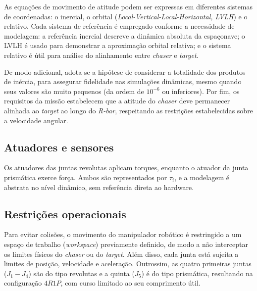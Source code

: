 As equações de movimento de atitude podem ser expressas em diferentes sistemas de coordenadas: o inercial, o orbital (\emph{Local-Vertical-Local-Horizontal, LVLH}) e o relativo.
Cada sistema de referência é empregado conforme a necessidade de modelagem:
a referência inercial descreve a dinâmica absoluta da espaçonave;
o LVLH é usado para demonstrar a aproximação orbital relativa;
e o sistema relativo é útil para análise do alinhamento entre \emph{chaser} e \emph{target}.

De modo adicional, adota-se a hipótese de considerar a totalidade dos produtos de inércia, para assegurar fidelidade nas simulações dinâmicas, mesmo quando seus valores são muito pequenos (da ordem de $10^{-6}$ ou inferiores).
Por fim, os requisitos da missão estabelecem que a atitude do \emph{chaser} deve permanecer alinhada ao \emph{target} ao longo do \emph{R-bar}, respeitando as restrições estabelecidas sobre a velocidade angular.

\subsection{Atuadores e sensores}
Os atuadores das juntas revolutas aplicam torques, enquanto o atuador da junta prismática exerce força.
Ambos são representados por $\tau_i$, e a modelagem é abstrata no nível dinâmico, sem referência direta ao hardware.

\subsection{Restrições operacionais}
Para evitar colisões, o movimento do manipulador robótico é restringido a um espaço de trabalho (\emph{workspace}) previamente definido, de modo a não interceptar os limites físicos do \emph{chaser} ou do \emph{target}.
Além disso, cada junta está sujeita a limites de posição, velocidade e aceleração.
Outrossim, as quatro primeiras juntas ($J_1 - J_4$) são do tipo revolutas e a quinta ($J_5$) é do tipo prismática, resultando na configuração $4R1P$, com curso limitado ao seu comprimento útil.


